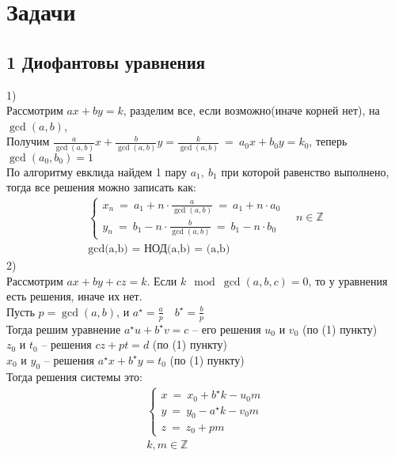 	\section{Задачи}
		\subsection{1 Диофантовы уравнения}
		1)\\
		Рассмотрим $ax+by = k$, разделим все, если возможно(иначе корней нет), на $\gcd(a,b)$,\\
		Получим $\frac{a}{\gcd(a,b)} x+ \frac{b}{\gcd(a,b)} y = \frac{k}{\gcd(a,b)} \ = \ a_0 x + b_0 y = k_0$, теперь $\gcd(a_0,b_0) = 1$\\ 
		По алгоритму евклида найдем 1 пару $a_1,\ b_1$ при которой равенство выполнено, тогда все решения можно записать как:\\
		\begin{gather*}
			\begin{cases}
				x_n \ = \ a_1 + n \cdot \frac{a}{\gcd(a,b)} \ = \ a_1 + n \cdot a_0\\
				y_n \ = \ b_1 - n \cdot \frac{b}{\gcd(a,b)} \ = \ b_1 - n \cdot b_0
			\end{cases}
			\quad n \in \mathbb{Z}\\
			\text{gcd(a,b) \ = \ НОД(a,b) \ = \ (a,b)}
		\end{gather*}
		2)\\
		Рассмотрим $ax+by+cz = k$. Если $k \mod \gcd(a, b, c) = 0$, то у уравнения есть решения, иначе их нет.\\
		Пусть $p = \gcd(a, b)$, и $a^{\star} = \frac{a}{p} \quad b^{\star} = \frac{b}{p}$\\
		Тогда решим уравнение $a^{\star} u + b^{\star} v = c$ -- его решения $u_0$ и $v_0$ (по (1) пункту)\\
		$z_0$ и $t_0$ -- решения $cz + pt = d$ (по (1) пункту)\\
		$x_0$ и $y_0$ -- решения $a^{\star} x + b^{\star} y = t_0$ (по (1) пункту)\\
		Тогда решения системы это:
		\begin{gather*}
			\begin{cases}
				x \ = \ x_0 + b^{\star} k - u_0 m \\
				y \ = \ y_0 - a^{\star} k - v_0 m \\
				z \ = \ z_0 + p m
			\end{cases}
			\\
			k, m \in \mathbb{Z}
		\end{gather*}
		
